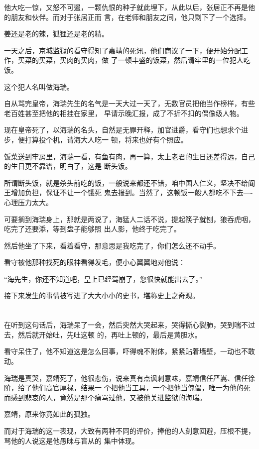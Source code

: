 \documentclass[11pt,a4paper,onecolumn]{article}
\begin{document}
他大吃一惊，又怒不可遏，一颗仇恨的种子就此埋下，从此以后，张居正不再是他的朋友和伙伴。而对于张居正而
言，在老师和朋友之间，他只剩下了一个选择。

姜还是老的辣，狐狸还是老的精。

一天之后，京城监狱的看守得知了嘉靖的死讯，他们商议了一下，便开始分配工作，买菜的买菜，买肉的买肉，做
了一顿丰盛的饭菜，然后请牢里的一位犯人吃饭。

这个犯人名叫做海瑞。

自从骂完皇帝，海瑞先生的名气是一天大过一天了，无数官员把他当作榜样，有些老百姓甚至把他的相挂在家里，
早请示晚汇报，成了不折不扣的偶像级人物。

现在皇帝死了，以海瑞的名头，自然是无罪开释，加官进爵，看守们也想求个进步，便打算投个机，请海大人吃一
顿，将来也好有个照应。

饭菜送到牢房里，海瑞一看，有鱼有肉，再一算，太上老君的生日还差得远，自己的生日更不靠谱，明白了，这是
断头饭。

所谓断头饭，就是杀头前吃的饭，一般说来都还不错，咱中国人仁义，坚决不给阎王增加负担，保证不让一个饿死
鬼去报到。当然了，这顿饭一般人都吃不下去----心理压力太大。

可要搁到海瑞身上，那就是两说了，海猛人二话不说，提起筷子就刨，狼吞虎咽，吃完了还要添，等到盘子能够照
出人影，他终于吃完了。

然后他坐了下来，看着看守，那意思是我吃完了，你们怎么还不动手。

看守被他那种找死的眼神看得发毛，便小心翼翼地对他说：

``海先生，你还不知道吧，皇上已经驾崩了，您很快就能出去了。''

接下来发生的事情被写进了大大小小的史书，堪称史上之奇观。

\section[\thesection]{}

在听到这句话后，海瑞呆了一会，然后突然大哭起来，哭得撕心裂肺，哭到喘不过去，然后就开始吐，先吐这顿
的，再吐上顿的，最后是黄胆水。

看守呆住了，他不知道这是怎么回事，吓得魂不附体，紧紧贴着墙壁，一动也不敢动。

海瑞是真哭，嘉靖死了，他很悲伤，说来真有点讽刺意味，嘉靖信任严嵩、信任徐阶，给了他们高官厚禄，结果一
个把他当工具，一个把他当傀儡，唯一为他的死而感到悲哀的人，竟然是那个痛骂过他，又被他关进监狱的海瑞。

嘉靖，原来你竟如此的孤独。

而对于海瑞的这一表现，大致有两种不同的评价，捧他的人刻意回避，压根不提，骂他的人说这是他愚昧与盲从的
集中体现。
\end{document}
